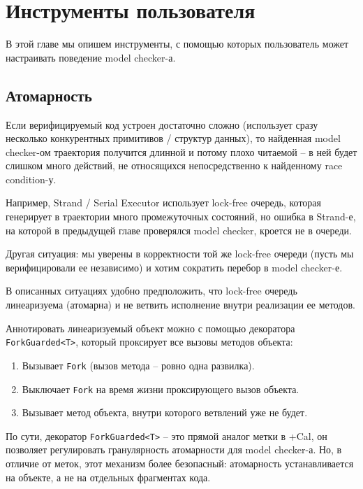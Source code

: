 \chapter{Инструменты пользователя}\label{ch:ch4}

В этой главе мы опишем инструменты, с помощью которых пользователь может настраивать поведение model checker-а.

\section{Атомарность}

Если верифицируемый код устроен достаточно сложно (использует сразу несколько конкурентных примитивов / структур данных), то найденная model checker-ом траектория получится длинной и потому плохо читаемой – в ней будет слишком много действий, не относящихся непосредственно к найденному race condition-у.

Например, Strand / Serial Executor использует lock-free очередь, которая генерирует в траектории много промежуточных состояний, но ошибка в Strand-е, на которой в предыдущей главе проверялся model checker, кроется не в очереди.

Другая ситуация: мы уверены в корректности той же lock-free очереди (пусть мы верифицировали ее независимо) и хотим сократить перебор в model checker-е.

В описанных ситуациях удобно предположить, что lock-free очередь линеаризуема (атомарна) и не ветвить исполнение внутри реализации ее методов.

Аннотировать линеаризуемый объект можно с помощью декоратора \texttt{ForkGuarded<T>}, который проксирует все вызовы методов объекта:

\begin{enumerate}
\item	Вызывает \texttt{Fork} (вызов метода – ровно одна развилка).

\item	Выключает \texttt{Fork} на время жизни проксирующего вызов объекта.

\item	Вызывает метод объекта, внутри которого ветвлений уже не будет.
\end{enumerate}

По сути, декоратор \texttt{ForkGuarded<T>} – это прямой аналог метки в +Cal, он позволяет регулировать гранулярность атомарности для model checker-а. Но, в отличие от меток, этот механизм более безопасный: атомарность устанавливается на объекте, а не на отдельных фрагментах кода.

